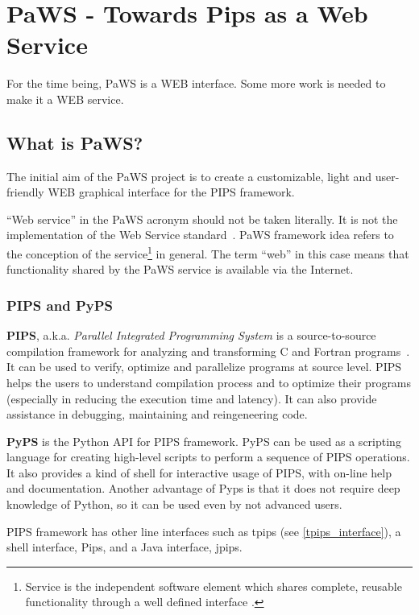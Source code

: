 \section{PaWS - Towards Pips as a Web Service}

For the time being, PaWS is a WEB interface. Some more work is needed
to make it a WEB service.


\subsection{What is PaWS?}

The initial aim of the PaWS project is to create a customizable, light and
user-friendly WEB graphical interface for the PIPS framework.

``Web service'' in the PaWS acronym should not be taken literally. It
is not the implementation of the Web Service
standard~\cite{ws_standard}. PaWS framework idea refers to the
conception of the service\footnote{Service is the independent software
  element which shares complete, reusable functionality through a
  well defined interface \cite{service_def}.} in general. The term
``web'' in this case means that functionality shared by the PaWS
service is available via the Internet.

\subsubsection{PIPS and PyPS}
\label{pips_and_pyps}

{\bf PIPS}, a.k.a. \emph{Parallel Integrated Programming System} is a
source-to-source compilation framework for analyzing and transforming
C and Fortran programs~\cite{pips4u}. It can be used to verify, optimize and
parallelize programs at source level. PIPS helps the users to
understand compilation process and to optimize their programs
(especially in reducing the execution time and latency). It can also
provide assistance in debugging, maintaining and reingeneering code.

{\bf PyPS} is the Python API for PIPS framework. PyPS can be used as a
scripting language for creating high-level scripts to perform a
sequence of PIPS operations. It also provides a kind of shell for
interactive usage of PIPS, with on-line help and documentation. Another
advantage of Pyps is that it does not require deep knowledge of
Python, so it can be used even by not advanced users.

PIPS framework has other line interfaces such as tpips (see
\ref{tpips_interface}), a shell interface, Pips, and a Java interface,
jpips.

